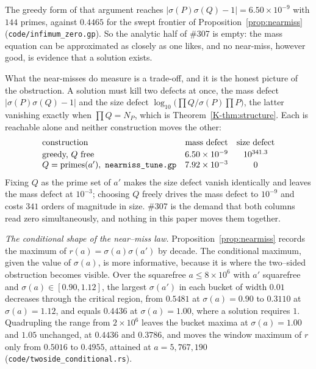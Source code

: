 \documentclass[11pt]{article}
\theoremstyle{definition}
\begin{document}
The greedy form of that argument reaches $|\sigma(P)\sigma(Q)-1|=6.50\times10^{-9}$ with $144$
primes, against $0.4465$ for the swept frontier of Proposition~\ref{prop:nearmiss}
\textup{(\texttt{code/infimum\_zero.gp})}. So the analytic half of \#307 is empty: the mass equation
can be approximated as closely as one likes, and no near-miss, however good, is evidence that a
solution exists.

What the near-misses do measure is a trade-off, and it is the honest picture of the obstruction. A
solution must kill two defects at once, the mass defect $|\sigma(P)\sigma(Q)-1|$ and the size defect
$\log_{10}\bigl(\prod Q\big/\sigma(P)\prod P\bigr)$, the latter vanishing exactly when
$\prod Q=N_P$, which is Theorem~\ref{K-thm:structure}. Each is reachable alone and neither
construction moves the other:
\[
\begin{array}{lcc}
\text{construction} & \text{mass defect} & \text{size defect}\\[2pt]
\text{greedy, } Q \text{ free} & 6.50\times10^{-9} & 10^{341.3}\\
Q=\text{primes}(a'),\ \text{\texttt{nearmiss\_tune.gp}} & 7.92\times10^{-3} & 0
\end{array}
\]
Fixing $Q$ as the prime set of $a'$ makes the size defect vanish identically and leaves the mass
defect at $10^{-3}$; choosing $Q$ freely drives the mass defect to $10^{-9}$ and costs $341$ orders
of magnitude in size. \#307 is the demand that both columns read zero simultaneously, and nothing in
this paper moves them together.

\emph{The conditional shape of the near--miss law.} Proposition~\ref{prop:nearmiss} records the
maximum of $r(a)=\sigma(a)\sigma(a')$ by decade. The conditional maximum, given the value of
$\sigma(a)$, is more informative, because it is where the two--sided obstruction becomes visible.
Over the squarefree $a\le8\times10^{6}$ with $a'$ squarefree and $\sigma(a)\in[0.90,1.12]$, the
largest $\sigma(a')$ in each bucket of width $0.01$ decreases through the critical region, from
$0.5481$ at $\sigma(a)=0.90$ to $0.3110$ at $\sigma(a)=1.12$, and equals $0.4436$ at
$\sigma(a)=1.00$, where a solution requires $1$. Quadrupling the range from $2\times10^{6}$ leaves
the bucket maxima at $\sigma(a)=1.00$ and $1.05$ unchanged, at $0.4436$ and $0.3786$, and moves the
window maximum of $r$ only from $0.5016$ to $0.4955$, attained at $a=5{,}767{,}190$
\textup{(\texttt{code/twoside\_conditional.rs})}.
\end{document}
